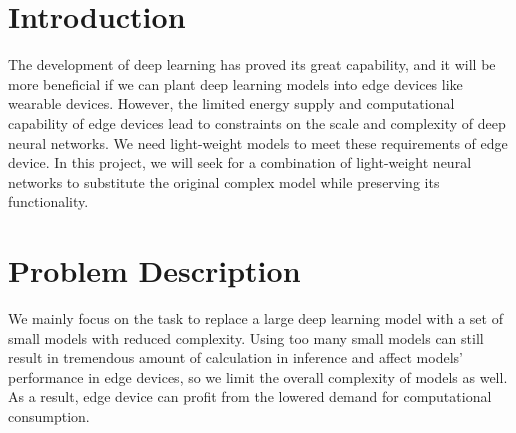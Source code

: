 \documentclass[acmsmall,nonacm]{acmart}\settopmatter{}
\begin{document}



\keywords{}  %


\maketitle

\section{Introduction}
The development of deep learning has proved its great capability, and it will be more beneficial if we can plant deep learning models into edge devices like wearable devices.
However, the limited energy supply and computational capability of edge devices lead to constraints on the scale and complexity of deep neural networks.
We need light-weight models to meet these requirements of edge device.
In this project, we will seek for a combination of light-weight neural networks to substitute the original complex model while preserving its functionality.

\section{Problem Description}
We mainly focus on the task to replace a large deep learning model with a set of small models with reduced complexity.
Using too many small models can still result in tremendous amount of calculation in inference and affect models' performance in edge devices, so we limit the overall complexity of models as well.
As a result, edge device can profit from the lowered demand for computational consumption.
\end{document}
